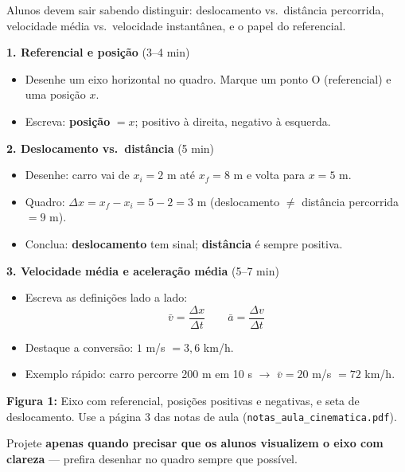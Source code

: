 \documentclass[12pt,a4paper]{article}
\begin{document}
\begin{tcolorbox}[blocobox={Objetivos}]
  Alunos devem sair sabendo distinguir:
  deslocamento vs.\ dist\^ancia percorrida,
  velocidade m\'edia vs.\ velocidade instant\^anea,
  e o papel do referencial.
\end{tcolorbox}

\begin{tcolorbox}[quadrobox]
  \textbf{1. Referencial e posi\c{c}\~ao} (3--4 min)
  \begin{itemize}[nosep]
    \item Desenhe um eixo horizontal no quadro. Marque um ponto O
          (referencial) e uma posi\c{c}\~ao $x$.
    \item Escreva: \textbf{posi\c{c}\~ao} $= x$; positivo \`a direita,
          negativo \`a esquerda.
  \end{itemize}

  \medskip
  \textbf{2. Deslocamento vs.\ dist\^ancia} (5 min)
  \begin{itemize}[nosep]
    \item Desenhe: carro vai de $x_i = 2$ m at\'e $x_f = 8$ m e volta para
          $x = 5$ m.
    \item Quadro: $\Delta x = x_f - x_i = 5 - 2 = 3$ m
          (deslocamento $\neq$ dist\^ancia percorrida $= 9$ m).
    \item Conclua: \textbf{deslocamento} tem sinal; \textbf{dist\^ancia}
          \'e sempre positiva.
  \end{itemize}

  \medskip
  \textbf{3. Velocidade m\'edia e acelera\c{c}\~ao m\'edia} (5--7 min)
  \begin{itemize}[nosep]
    \item Escreva as defini\c{c}\~oes lado a lado:
    \[
      \bar{v} = \frac{\Delta x}{\Delta t} \qquad
      \bar{a} = \frac{\Delta v}{\Delta t}
    \]
    \item Destaque a convers\~ao: $1$ m/s $= 3{,}6$ km/h.
    \item Exemplo r\'apido: carro percorre 200 m em 10 s $\to$
          $\bar{v} = 20$ m/s $= 72$ km/h.
  \end{itemize}
\end{tcolorbox}

\begin{tcolorbox}[projetorbox]
  \textbf{Figura 1:} Eixo com referencial, posi\c{c}\~oes positivas e
  negativas, e seta de deslocamento.
  Use a p\'agina 3 das notas de aula (\texttt{notas\_aula\_cinematica.pdf}).

  \medskip
  Projete \textbf{apenas quando precisar que os alunos visualizem o eixo
  com clareza} --- prefira desenhar no quadro sempre que possível.
\end{tcolorbox}
\end{document}

